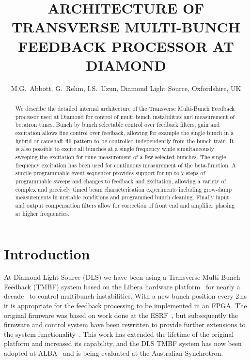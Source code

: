 \documentclass{jacow}
\begin{document}
\title{ARCHITECTURE OF TRANSVERSE MULTI-BUNCH FEEDBACK PROCESSOR AT DIAMOND}
\author{M.G.~Abbott, G.~Rehm, I.S.~Uzun, Diamond Light Source, Oxfordshire, UK}
\maketitle


\begin{abstract}

We describe the detailed internal architecture of the Transverse Multi-Bunch
Feedback processor used at Diamond for control of multi-bunch instabilities and
measurement of betatron tunes.  Bunch by bunch selectable control over
feedback filters, gain and excitation allows fine control over feedback,
allowing for example the single bunch in a hybrid or camshaft fill pattern to
be controlled independently from the bunch train.  It is also possible to
excite all bunches at a single frequency while simultaneously sweeping the
excitation for tune measurement of a few selected bunches.  The single
frequency excitation has been used for continuous measurement of the
beta-function.  A simple programmable event sequencer provides support for up
to 7 steps of programmable sweeps and changes to feedback and excitation,
allowing a variety of complex and precisely timed beam characterisation
experiments including grow-damp measurements in unstable conditions and
programmed bunch cleaning.  Finally input and output compensation filters
allow for correction of front end and amplifier phasing at higher frequencies.

\end{abstract}



\section{Introduction}

At Diamond Light Source (DLS) we have been using a Transverse Multi-Bunch
Feedback (TMBF) system based on the Libera hardware platform~\cite{libera} for
nearly a decade~\cite{dipac2007, epac2008, biw2010, icalepcs2011} to control
multibunch instabilities.  With a new bunch position every 2\,ns it is
appropriate for the feedback processing to be implemented in an FPGA.  The
original firmware was based on work done at the ESRF~\cite{epac2006}, but
subsequently the firmware and control system have been rewritten to provide
further extensions to the system functionality~\cite{ibic2013, ibic2014}.  This
work has extended the lifetime of the original platform and increased its
capability, and the DLS TMBF system has now been adopted at ALBA~\cite{ibic2015}
and is being evaluated at the Australian Synchrotron.
\end{document}
